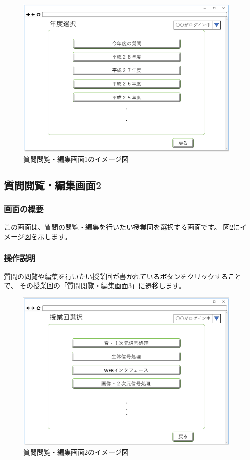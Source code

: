\begin{figure}[htbp]
  \begin{center}
    \includegraphics[width=0.8\linewidth,clip]{./img/17.png}
    \caption{質問閲覧・編集画面1のイメージ図}\label{fig:17}
  \end{center}
\end{figure}

\newpage

\subsection{質問閲覧・編集画面2}
\subsubsection{画面の概要}
この画面は、質問の閲覧・編集を行いたい授業回を選択する画面です。
図\ref{fig:18}にイメージ図を示します。

\subsubsection{操作説明}
質問の閲覧や編集を行いたい授業回が書かれているボタンをクリックすることで、
その授業回の「質問閲覧・編集画面3」に遷移します。

\begin{figure}[htbp]
  \begin{center}
    \includegraphics[width=0.8\linewidth,clip]{./img/18.png}
    \caption{質問閲覧・編集画面2のイメージ図}\label{fig:18}
  \end{center}
\end{figure}


